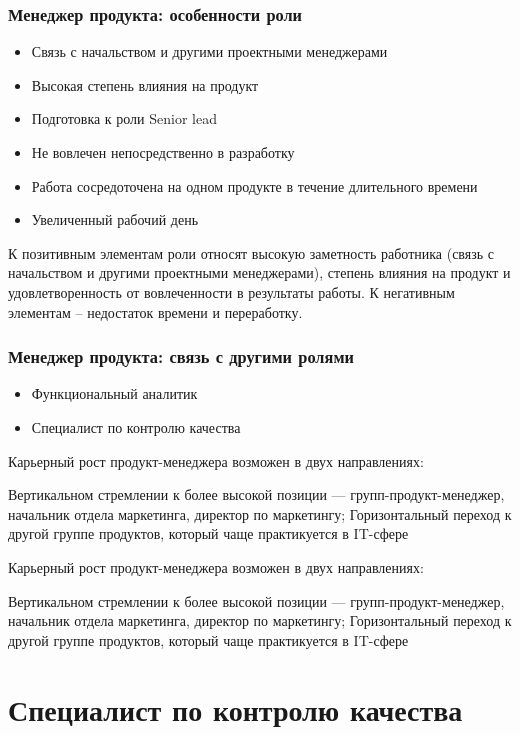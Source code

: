 \documentclass{../industrial-development}
\begin{document}
\begin{frame} \frametitle{Менеджер продукта: особенности роли}
  \begin{itemize}
  \item Связь с начальством и другими проектными менеджерами
  \item Высокая степень влияния на продукт
  \item Подготовка к роли Senior lead
  \item Не вовлечен непосредственно в разработку
  \item Работа сосредоточена на одном продукте в течение длительного времени
  \item Увеличенный рабочий день
  \end{itemize}
\end{frame}

\lecturenotes

К позитивным элементам роли относят высокую заметность работника (связь с начальством и другими проектными менеджерами), степень влияния на продукт и удовлетворенность от вовлеченности в результаты работы. 
К негативным элементам – недостаток времени и переработку. 
  ~\cite{Anatomy}

\begin{frame} \frametitle{Менеджер продукта: связь с другими ролями}
  \begin{itemize}
  \item Функциональный аналитик
  \item Специалист по контролю качества
  \end{itemize}

\begin{block}{}
	\alert {} Карьерный рост продукт-менеджера возможен в двух направлениях:

	Вертикальном стремлении к более высокой позиции — групп-продукт-менеджер, начальник отдела маркетинга, директор по маркетингу;
	Горизонтальный переход к другой группе продуктов, который чаще практикуется в IT-сфере
\end{block}

\end{frame}

\lecturenotes
Карьерный рост продукт-менеджера возможен в двух направлениях:

Вертикальном стремлении к более высокой позиции — групп-продукт-менеджер, начальник отдела маркетинга, директор по маркетингу;
Горизонтальный переход к другой группе продуктов, который чаще практикуется в IT-сфере

\section{Специалист по контролю качества }
\end{document}
